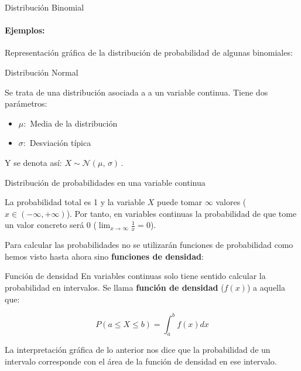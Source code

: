 \documentclass[11pt]{beamer}
\begin{document}
\begin{frame}{Distribución Binomial}
         
\paragraph{Ejemplos:} Representación gráfica de la distribución de probabilidad de algunas binomiales:    
         

    
\end{frame}



\begin{frame}
{Distribución Normal}

Se trata de una distribución asociada a a un variable continua. Tiene dos parámetros:
\begin{itemize} [<+->]
    \item $\mu :$ Media de la distribución
    \item $\sigma :$ Desviación típica
\end{itemize}
Y se denota así: $
X \sim \mathcal{N}(\mu,\,\sigma)\,.
    $ 
\end{frame}

\begin{frame}{Distribución de probabilidades en una variable continua}

La probabilidad total es 1 y la variable $X$ puede tomar $\infty$ valores ($x \in \left(-\infty, +\infty\right)$). Por tanto, en variables continuas la probabilidad de que tome un valor concreto será 0 ($\lim_{x \to \infty}\frac{1}{x}=0$).    

Para calcular las probabilidades no se utilizarán funciones de probabilidad como hemos visto hasta ahora sino \textbf{funciones de densidad}:
\end{frame}

\begin{frame}{Función de densidad}
En variables continuas solo tiene sentido calcular la probabilidad en intervalos.
Se llama \textbf{función de densidad} ($f(x)$) a aquella que: 
\begin{block}{}
$$P\left(a\leq X \leq b \right) = \int_{a}^{b} f(x) dx$$
\end{block}    


La interpretación gráfica de lo anterior nos dice que la probabilidad de un intervalo corresponde con el área de la función de densidad en ese intervalo.
\begin{center}


\end{center}
\end{frame}
\end{document}
